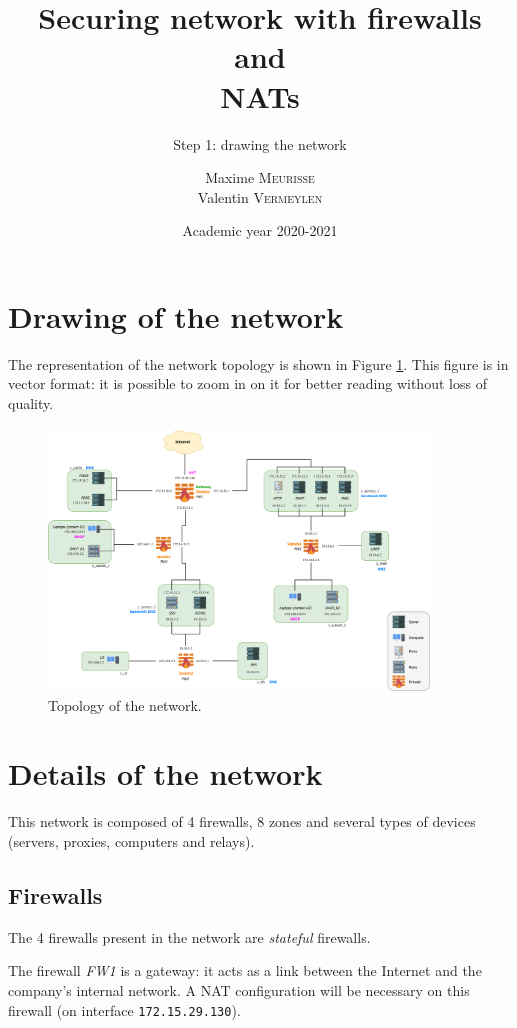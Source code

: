 \documentclass[a4paper, 12pt]{article}
\institute{University of Liège}
\title{Securing network with firewalls and\\NATs}
\subtitle{Step 1: drawing the network}
\author{Maxime \textsc{Meurisse}\\Valentin \textsc{Vermeylen}}
\date{Academic year 2020-2021}
\begin{document}
	\maketitle
	
	\section{Drawing of the network}
	
	The representation of the network topology is shown in Figure \ref{fig:network.topology}. This figure is in vector format: it is possible to zoom in on it for better reading without loss of quality.
	
	\begin{figure}[H]
	    \centering
	    \includegraphics[width=0.9\textwidth]{resources/pdf/topology.pdf}
	    \caption{Topology of the network.}
	    \label{fig:network.topology}
	\end{figure}
	
	\section{Details of the network}
	
	This network is composed of 4 firewalls, 8 zones and several types of devices (servers, proxies, computers and relays).
	
	\subsection{Firewalls}
	
	The 4 firewalls present in the network are \emph{stateful} firewalls.
	
	The firewall \emph{FW1} is a gateway: it acts as a link between the Internet and the company's internal network. A NAT configuration will be necessary on this firewall (on interface \texttt{172.15.29.130}).
	
\end{document}
